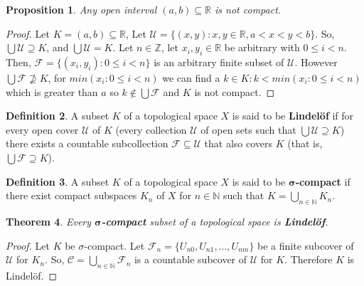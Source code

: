 \documentclass{amsart}
\theoremstyle{plain}
\newtheorem{theorem}{Theorem}
\newtheorem{proposition}[theorem]{Proposition}
\theoremstyle{definition}
\newtheorem{definition}[theorem]{Definition}
\theoremstyle{remark}
\begin{document}
	\begin{proposition}
	  Any open interval \((a,b)\subseteq\mathbb R\) is not compact.
	\end{proposition}
	\begin{proof}
	Let $K = (a, b) \subseteq \mathbb{R}$, Let $\mathcal{U} = \lbrace (x, y) : x, y \in \mathbb{R}, a < x < y < b \rbrace$. So, $\bigcup \mathcal{U} \supseteq K$, and $\bigcup \mathcal{U} = K$. Let $n \in \mathbb{Z}$, let $x_i, y_i \in \mathbb{R}$ be arbitrary with $0 \leq i < n$. Then, $\mathcal{F} = \lbrace (x_i, y_i) : 0 \leq i < n \rbrace$ is an arbitrary finite subset of $\mathcal{U}$. However $\bigcup \mathcal{F} \not\supseteq K$, for $min(x_i : 0 \leq i < n)$ we can find a $k \in K : k < min(x_i : 0 \leq i < n)$ which is greater than $a$ so $k \not\in \bigcup \mathcal{F}$ and $K$ is not compact.
	\end{proof}

	\begin{definition}
	  A subset \(K\) of a topological space \(X\) is said to be \textbf{Lindel\"of} if for every
	  open cover \(\mathcal U\) of \(K\) (every collection \(\mathcal U\) of open sets
	  such that \(\bigcup \mathcal U\supseteq K\)) there exists a countable subcollection
	  \(\mathcal F\subseteq \mathcal U\) that also covers \(K\) (that is,
	  \(\bigcup\mathcal F\supseteq K\)).
	\end{definition}

	\begin{definition}
	  A subset \(K\) of a topological space \(X\) is said to be \textbf{\(\boldsymbol{\sigma}\)-compact} if
	  there exist compact subspaces \(K_n\) of \(X\) for \(n\in\mathbb N\) such that
	  \(K=\bigcup_{n\in\mathbb N} K_n\).
	  \newline \newline
	\end{definition}
	\begin{theorem}
		Every \(\boldsymbol{\sigma}\)\textbf{-compact} subset of a topological space is \textbf{Lindel\"of}.
	\end{theorem}
	\begin{proof}
	Let $K$ be \(\sigma\)-compact. Let $\mathcal{F}_n = \lbrace U_{n0}, U_{n1}, ..., U_{nm} \rbrace$ be a finite subcover of $\mathcal{U}$ for $K_n$. So, $\mathcal{C} = \bigcup_{n \in \mathbb{N}} \mathcal{F}_n$ is a countable subcover of $\mathcal{U}$ for $K$. Therefore $K$ is Lindel\"of.
	
	\end{proof}
\end{document}
